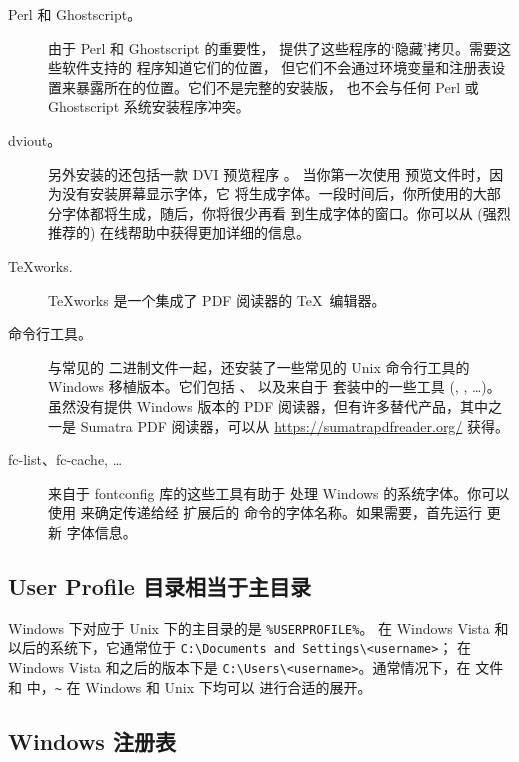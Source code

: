 \documentclass{article}
\begin{document}
\begin{description}
\item[Perl 和 Ghostscript。] 由于 Perl 和  Ghostscript 的重要性，\TL{}
提供了这些程序的`隐藏'拷贝。需要这些软件支持的 \TL{} 程序知道它们的位置，
但它们不会通过环境变量和注册表设置来暴露所在的位置。它们不是完整的安装版，
也不会与任何 Perl 或 Ghostscript 系统安装程序冲突。

\item[dviout。] 另外安装的还包括一款 DVI 预览程序 。
当你第一次使用  预览文件时，因为没有安装屏幕显示字体，它
将生成字体。一段时间后，你所使用的大部分字体都将生成，随后，你将很少再看
到生成字体的窗口。你可以从 (强烈推荐的) 在线帮助中获得更加详细的信息。

\item[\TeX{}works.]  \TeX{}works 是一个集成了 PDF 阅读器的
  \TeX\ 编辑器。

\item[命令行工具。] 与常见的 \TL{} 二进制文件一起，还安装了一些常见的
Unix 命令行工具的 Windows 移植版本。它们包括 、
 以及来自于  套装中的一些工具
(, , \ldots)。
虽然没有提供 Windows 版本的 PDF 阅读器，但有许多替代产品，其中之一是
Sumatra PDF 阅读器，可以从 \url{https://sumatrapdfreader.org/} 获得。

\item[fc-list、fc-cache, \ldots] 来自于 fontconfig 库的这些工具有助于 \XeTeX{}
处理 Windows 的系统字体。你可以使用  来确定传递给经 \XeTeX
扩展后的  命令的字体名称。如果需要，首先运行  更新
字体信息。
\end{description}


\subsection{User Profile 目录相当于主目录}
\label{sec:winhome}

Windows 下对应于 Unix 下的主目录的是 \verb|%USERPROFILE%|。
在 Windows Vista 和以后的系统下，它通常位于
\verb|C:\Documents and Settings\<username>|；
在 Windows Vista 和之后的版本下是 \verb|C:\Users\<username>|。通常情况下，在
 文件和 \KPS{} 中，\verb|~| 在 Windows 和 Unix 下均可以
进行合适的展开。

\subsection{Windows 注册表}
\label{sec:registry}
\end{document}
